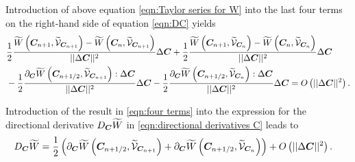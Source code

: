 Introduction of above equation \eqref{eqn:Taylor series for W} into the last four terms on the right-hand side of equation \eqref{eqn:DC} yields
%
\begin{equation}\label{eqn:four terms}
\begin{aligned}
&\frac{1}{2}\frac{\widetilde{W}\left(\vect{C}_{n+1},\widetilde{\mathcal{V}}_{\vect{C}_{n+1}}\right) - \widetilde{W}\left(\vect{C}_{n},\widetilde{\mathcal{V}}_{\vect{C}_{n+1}}\right)}{\vert\vert\Delta\vect{C}\vert\vert^2}\Delta\vect{C}
%
+\frac{1}{2}\frac{\widetilde{W}\left(\vect{C}_{n+1},\widetilde{\mathcal{V}}_{\vect{C}_{n}}\right) - \widetilde{W}\left(\vect{C}_{n},\widetilde{\mathcal{V}}_{\vect{C}_{n}}\right)}{\vert\vert\Delta\vect{C}\vert\vert^2}\Delta\vect{C}\\
%
&-\frac{1}{2}\frac{\partial_{\vect{C}}\widetilde{W}\left(\vect{C}_{n+1/2},\widetilde{\mathcal{V}}_{\vect{C}_{n+1}}\right):\Delta\vect{C}}{\vert\vert\Delta\vect{C}\vert\vert^2}\Delta\vect{C} - \frac{1}{2}\frac{\partial_{\vect{C}}\widetilde{W}\left(\vect{C}_{n+1/2},\widetilde{\mathcal{V}}_{\vect{C}_{n}}\right):\Delta\vect{C}}{\vert\vert\Delta\vect{C}\vert\vert^2}\Delta\vect{C} = O\left(\vert\vert\Delta\vect{C}\vert\vert^2\right).
%
\end{aligned}
\end{equation}

Introduction of the result in \eqref{eqn:four terms} into the expression for the directional derivative $D_{\boldsymbol{C}}\widetilde{W}$ in \eqref{eqn:directional derivatives C} leads to
%
\begin{equation}\label{eqn:DC II}
\begin{aligned}
D_{\vect{C}}\widetilde{W}& =  \frac{1}{2}\left(\partial_{\vect{C}}\widetilde{W}\left(\vect{C}_{n+1/2},\widetilde{\mathcal{V}}_{\vect{C}_{n+1}}\right) + 
\partial_{\vect{C}}\widetilde{W}\left(\vect{C}_{n+1/2},\widetilde{\mathcal{V}}_{\vect{C}_{n}}\right)\right) + O\left(\vert\vert\Delta\vect{C}\vert\vert^2\right).
%
%
\end{aligned}
\end{equation}

